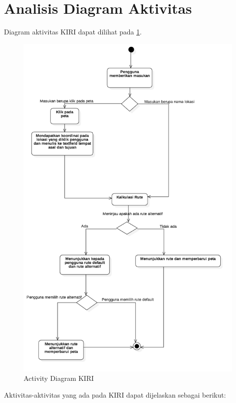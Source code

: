 \section{Analisis Diagram Aktivitas}
\label{sec:activitydiagram}
Diagram aktivitas KIRI dapat dilihat pada \ref{fig:3_activitydiagram}.

\begin{figure}[H]
	\centering
	\includegraphics[scale=0.5]{Gambar/activitydiagram}
	\caption{Activity Diagram KIRI} 
	\label{fig:3_activitydiagram}
\end{figure}

Aktivitas-aktivitas yang ada pada KIRI dapat dijelaskan sebagai berikut:

